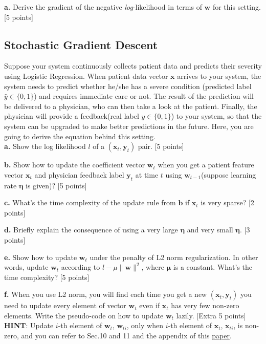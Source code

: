 \documentclass[12pt]{article}
\begin{document}
\textbf{a.} Derive the gradient of the negative \textit{log}-likelihood in terms of $\mathbf{w}$ for this setting. [5 points] 

\subsection{Stochastic Gradient Descent}
Suppose your system continuously collects patient data and predicts their severity using Logistic Regression. When patient data vector $\mathbf{x}$ arrives to your system, the system needs to predict whether he/she has a severe condition (predicted label $\hat{y} \in \{0, 1\}$) and requires immediate care or not. The result of the prediction will be delivered to a physician, who can then take a look at the patient. Finally, the physician will provide a feedback(real label $y \in \{0, 1\}$) to your system, so that the system can be upgraded to make better predictions in the future. Here, you are going to derive the equation behind this setting. \\

\textbf{a.} Show the log likelihood $l$ of a $(\mathbf{x}_t, \mathbf{y}_t)$ pair. [5 points]

\textbf{b.} Show how to update the coefficient vector $\mathbf{w}_t$ when you get a patient feature vector $\mathbf{x}_t$ and physician feedback label $\mathbf{y}_t$ at time $t$ using $\mathbf{w}_{t-1}$(suppose learning rate $\mathbf{\eta}$ is given)? [5 points]

\textbf{c.} What's the time complexity of the update rule from $\mathbf{b}$ if $\mathbf{x}_t$ is very sparse? [2 points]

\textbf{d.} Briefly explain the consequence of using a very large $\mathbf{\eta}$ and very small $\mathbf{\eta}$. [3 points]

\textbf{e.} Show how to update $\mathbf{w}_t$ under the penalty of L2 norm regularization. In other words, update $\mathbf{w}_t$ according to $l - \mu \|\mathbf{w}\|^2 $, where $\mathbf{\mu}$ is a constant. What's the time complexity? [5 points]

\textbf{f.} When you use L2 norm, you will find each time you get a new $(\mathbf{x}_t, \mathbf{y}_t)$ you need to update every element of vector $\mathbf{w}_t$ even if $\mathbf{x}_t$ has very few non-zero elements. Write the pseudo-code on how to update $\mathbf{w}_t$ lazily. [Extra 5 points] \\

\textbf{HINT}: Update $i$-th element of $\mathbf{w}_{t}$, $\mathbf{w}_{ti}$, only when $i$-th element of $\mathbf{x}_{t}$, $\mathbf{x}_{ti}$, is non-zero, and you can refer to Sec.10 and 11 and the appendix of this \href{http://lingpipe.files.wordpress.com/2008/04/lazysgdregression.pdf}{paper}. 
\end{document}
